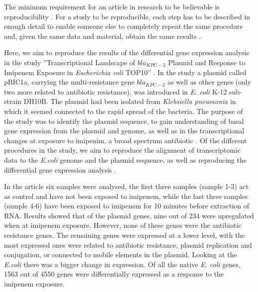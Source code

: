 
The minimum requirement for an article in research to be believable is reproducibility \cite{goodman2016does,peng2011reproducible}. For a study to be reproducible, each step has to be described in enough detail to enable someone else to completely repeat the same procedure and, given the same data and material, obtain the same results \cite{goodman2016does}.

Here, we aim to reproduce the results of the differential gene expression analysis in the study ”Transcriptional Landscape of $bla_{KPC-2}$ Plasmid and Response to Imipenem Exposure in \textit{Escherichia coli} TOP10” \cite{jousset2018transcriptional}. In the study a plasmid called pBIC1a, carrying the multi-resistance gene $bla_{KPC-2}$ as well as other genes (only two more related to antibiotic resistance), was introduced in \textit{E. coli} K-12 sub-strain DH10B. The plasmid had been isolated from \textit{Klebsiella pneumonia} in which it seemed connected to the rapid spread of the bacteria. The purpose of the study was to identify the plasmid sequence, to gain understanding of basal gene expression from the plasmid and genome, as well as in the transcriptional changes at exposure to imipenim, a broad spectrum antibiotic \cite{clissold1987imipenem}. Of the different procedures in the study, we aim to reproduce the alignment of transcriptomic data to the \textit{E.coli} genome and the plasmid sequence, as well as reproducing the differential gene expression analysis  \cite{jousset2018transcriptional, rosinski2015single}.

 In the article six samples were analysed, the first three samples (sample 1-3) act as control and have not been exposed to  imipenem, while the last three samples (sample 4-6) have been exposed to imipenem for 10 minutes before extraction of RNA. Results showed that of the plasmid genes, nine out of 234 were upregulated when at imipenem exposure. However, none of these genes were the antibiotic resistance genes. The remaining genes were expressed at a lower level, with the most expressed ones were related to antibiotic resistance, plasmid replication and conjugation, or connected to mobile elements in the plasmid. Looking at the \textit{E.coli} there was a bigger change in expression. Of all the native \textit{E. coli} genes, 1563 out of 4550 genes were differentially expressed as a response to the imipenem exposure.


